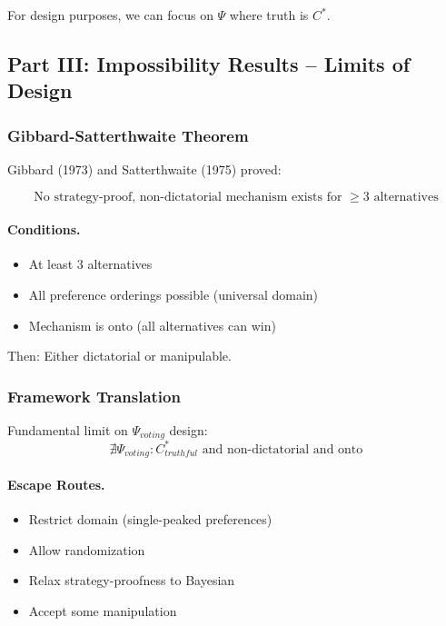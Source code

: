 For design purposes, we can focus on $\Psi$ where truth is $C^*$.

\subsection{Part III: Impossibility Results – Limits of Design}

\subsubsection{Gibbard-Satterthwaite Theorem}

Gibbard (1973) and Satterthwaite (1975) proved:

\begin{equation}
\boxed{
\text{No strategy-proof, non-dictatorial mechanism exists for } \geq 3 \text{ alternatives}
}
\label{eq:gibbard-satterthwaite}
\end{equation}

\paragraph{Conditions.}
\begin{itemize}
    \item At least 3 alternatives
    \item All preference orderings possible (universal domain)
    \item Mechanism is onto (all alternatives can win)
\end{itemize}

Then: Either dictatorial or manipulable.

\subsubsection{Framework Translation}

Fundamental limit on $\Psi_{voting}$ design:
\begin{equation}
\nexists \Psi_{voting}: C^*_{truthful} \text{ and non-dictatorial and onto}
\end{equation}

\paragraph{Escape Routes.}
\begin{itemize}
    \item Restrict domain (single-peaked preferences)
    \item Allow randomization
    \item Relax strategy-proofness to Bayesian
    \item Accept some manipulation
\end{itemize}

